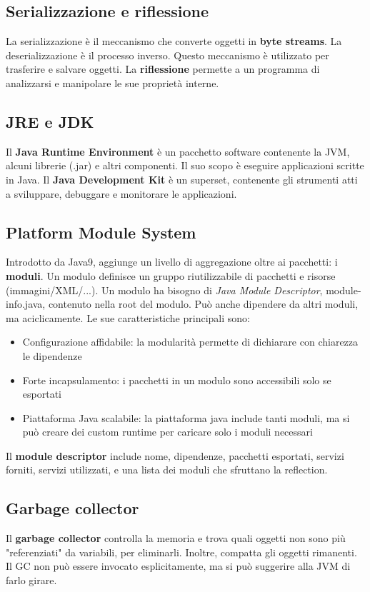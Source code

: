 \documentclass[11pt]{article}
\begin{document}
\subsection{Serializzazione e riflessione}
La serializzazione è il meccanismo che converte oggetti in \textbf{byte streams}. La deserializzazione è il processo inverso. Questo meccanismo è utilizzato per trasferire e salvare oggetti. La \textbf{riflessione} permette a un programma di analizzarsi e manipolare le sue proprietà interne.
\subsection{JRE e JDK}
Il \textbf{Java Runtime Environment} è un pacchetto software contenente la JVM, alcuni librerie (.jar) e altri componenti. Il suo scopo è eseguire applicazioni scritte in Java. Il \textbf{Java Development Kit} è un superset, contenente gli strumenti atti a sviluppare, debuggare e monitorare le applicazioni. 
\subsection{Platform Module System}
Introdotto da Java9, aggiunge un livello di aggregazione oltre ai pacchetti: i \textbf{moduli}. Un modulo definisce un gruppo riutilizzabile di pacchetti e risorse (immagini/XML/...). Un modulo ha bisogno di \textit{Java Module Descriptor}, module-info.java, contenuto nella root del modulo. Può anche dipendere da altri moduli, ma aciclicamente.
Le sue caratteristiche principali sono:
\begin{itemize}
    \item Configurazione affidabile: la modularità permette di dichiarare con chiarezza le dipendenze
    \item Forte incapsulamento: i pacchetti in un modulo sono accessibili solo se esportati
    \item Piattaforma Java scalabile: la piattaforma java include tanti moduli, ma si può creare dei custom runtime per caricare solo i moduli necessari
\end{itemize} 
Il \textbf{module descriptor} include nome, dipendenze, pacchetti esportati, servizi forniti, servizi utilizzati, e una lista dei moduli che sfruttano la reflection.
\subsection{Garbage collector}
Il \textbf{garbage collector} controlla la memoria e trova quali oggetti non sono più "referenziati" da variabili, per eliminarli. Inoltre, compatta gli oggetti rimanenti. Il GC non può essere invocato esplicitamente, ma si può suggerire alla JVM di farlo girare.
\end{document}
